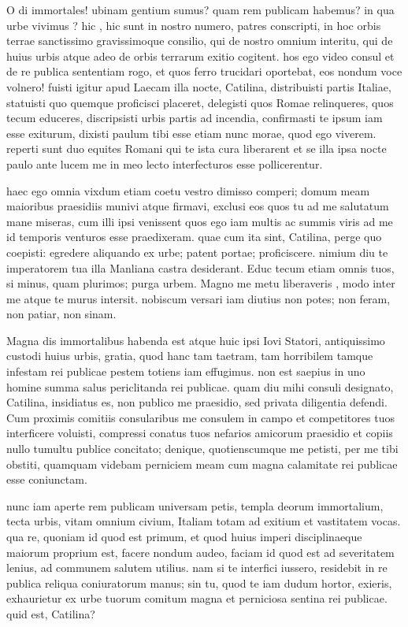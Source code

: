  O di immortales! ubinam gentium sumus? quam rem publicam habemus? in qua urbe vivimus ? hic , hic sunt in nostro numero, patres conscripti, in hoc orbis terrae sanctissimo gravissimoque consilio, qui de nostro omnium interitu, qui de huius urbis atque adeo de orbis terrarum exitio cogitent. hos ego video consul et de re publica sententiam rogo, et quos ferro trucidari oportebat, eos nondum voce volnero! fuisti igitur apud Laecam illa nocte, Catilina, distribuisti partis Italiae, statuisti quo quemque proficisci placeret, delegisti quos Romae relinqueres, quos tecum educeres, discripsisti urbis partis ad incendia, confirmasti te ipsum iam esse exiturum, dixisti paulum tibi esse etiam nunc morae, quod ego viverem. reperti sunt duo equites Romani qui te ista cura liberarent et se illa ipsa nocte paulo ante lucem me in meo lecto interfecturos esse pollicerentur.

 haec ego omnia vixdum etiam coetu vestro dimisso comperi; domum meam maioribus praesidiis munivi atque firmavi, exclusi eos quos tu ad me salutatum mane miseras, cum illi ipsi venissent quos ego iam multis ac summis viris ad me id temporis venturos esse praedixeram. quae cum ita sint, Catilina, perge quo coepisti: egredere aliquando ex urbe; patent portae; proficiscere. nimium diu te imperatorem tua illa Manliana castra desiderant. Educ tecum etiam omnis tuos, si minus, quam plurimos; purga urbem. Magno me metu liberaveris , modo inter me atque te murus intersit. nobiscum versari iam diutius non potes; non feram, non patiar, non sinam.

 Magna dis immortalibus habenda est atque huic ipsi Iovi Statori, antiquissimo custodi huius urbis, gratia, quod hanc tam taetram, tam horribilem tamque infestam rei publicae pestem totiens iam effugimus. non est saepius in uno homine summa salus periclitanda rei publicae. quam diu mihi consuli designato, Catilina, insidiatus es, non publico me praesidio, sed privata diligentia defendi. Cum proximis comitiis consularibus me consulem in campo et competitores tuos interficere voluisti, compressi conatus tuos nefarios amicorum praesidio et copiis nullo tumultu publice concitato; denique, quotienscumque me petisti, per me tibi obstiti, quamquam videbam perniciem meam cum magna calamitate rei publicae esse coniunctam.

 nunc iam aperte rem publicam universam petis, templa deorum immortalium, tecta urbis, vitam omnium civium, Italiam totam ad exitium et vastitatem vocas. qua re, quoniam id quod est primum, et quod huius imperi disciplinaeque maiorum proprium est, facere nondum audeo, faciam id quod est ad severitatem lenius, ad communem salutem utilius. nam si te interfici iussero, residebit in re publica reliqua coniuratorum manus; sin tu, quod te iam dudum hortor, exieris, exhaurietur ex urbe tuorum comitum magna et perniciosa sentina rei publicae. quid est, Catilina?

